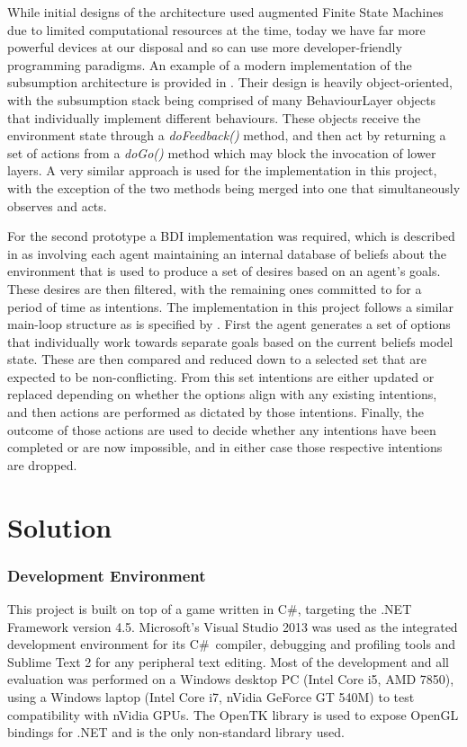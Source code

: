 \documentclass[a4paper,12pt]{article}
\newcommand{\Csh}{C{\lserif\#}}
\begin{document}
While initial designs of the architecture used augmented Finite State Machines \cite{brooks86} due to limited computational resources at the time, today we have far more powerful devices at our disposal and so can use more developer-friendly programming paradigms. An example of a modern implementation of the subsumption architecture is provided in . Their design is heavily object-oriented, with the subsumption stack being comprised of many BehaviourLayer objects that individually implement different behaviours. These objects receive the environment state through a \emph{doFeedback()} method, and then act by returning a set of actions from a \emph{doGo()} method which may block the invocation of lower layers. A very similar approach is used for the implementation in this project, with the exception of the two methods being merged into one that simultaneously observes and acts.

For the second prototype a BDI implementation was required, which is described in  as involving each agent maintaining an internal database of beliefs about the environment that is used to produce a set of desires based on an agent's goals. These desires are then filtered, with the remaining ones committed to for a period of time as intentions. The implementation in this project follows a similar main-loop structure as is specified by . First the agent generates a set of options that individually work towards separate goals based on the current beliefs model state. These are then compared and reduced down to a selected set that are expected to be non-conflicting. From this set intentions are either updated or replaced depending on whether the options align with any existing intentions, and then actions are performed as dictated by those intentions. Finally, the outcome of those actions are used to decide whether any intentions have been completed or are now impossible, and in either case those respective intentions are dropped.

\newpage
\section{Solution}
\subsubsection{Development Environment}\noindent
This project is built on top of a game written in \Csh, targeting the .NET Framework version 4.5. Microsoft's Visual Studio 2013 was used as the integrated development environment for its \Csh~compiler, debugging and profiling tools and Sublime Text 2 for any peripheral text editing. Most of the development and all evaluation was performed on a Windows desktop PC (Intel Core i5, AMD 7850), using a Windows laptop (Intel Core i7, nVidia GeForce GT 540M) to test compatibility with nVidia GPUs. The OpenTK library is used to expose OpenGL bindings for .NET and is the only non-standard library used.
\end{document}
